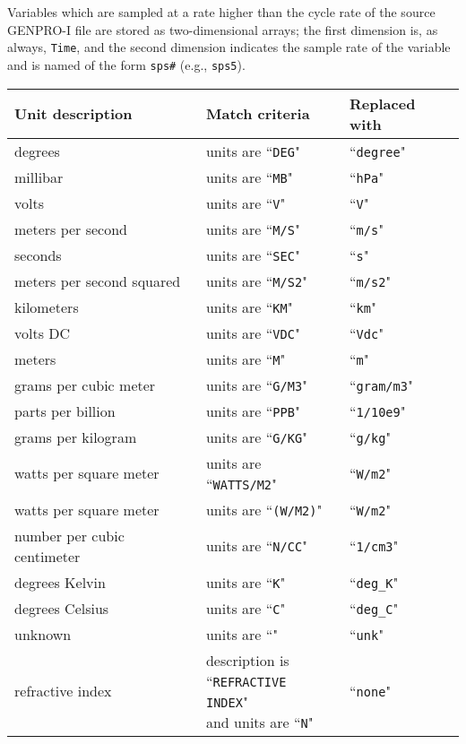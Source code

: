 \documentclass{report}
\begin{document}
Variables which are sampled at a rate higher than the cycle rate of the source GENPRO-I file are stored as two-dimensional arrays; the first dimension is, as always, \texttt{Time}, and the second dimension indicates the sample rate of the variable and is named of the form \texttt{sps\#} (e.g., \texttt{sps5}).

\begin{table}
\centering
\begin{tabular}{lll}
\toprule
Unit description & Match criteria & Replaced with \\
\midrule
degrees                     & units are ``\texttt{DEG}"      & ``\texttt{degree}" \\
millibar                    & units are ``\texttt{MB}"       & ``\texttt{hPa}" \\
volts                       & units are ``\texttt{V}"        & ``\texttt{V}" \\
meters per second           & units are ``\texttt{M/S}"      & ``\texttt{m/s}" \\
seconds                     & units are ``\texttt{SEC}"      & ``\texttt{s}" \\
meters per second squared   & units are ``\texttt{M/S2}"     & ``\texttt{m/s2}" \\
kilometers                  & units are ``\texttt{KM}"       & ``\texttt{km}" \\
volts DC                    & units are ``\texttt{VDC}"      & ``\texttt{Vdc}" \\
meters                      & units are ``\texttt{M}"        & ``\texttt{m}" \\
grams per cubic meter       & units are ``\texttt{G/M3}"     & ``\texttt{gram/m3}" \\
parts per billion           & units are ``\texttt{PPB}"      & ``\texttt{1/10e9}" \\
grams per kilogram          & units are ``\texttt{G/KG}"     & ``\texttt{g/kg}" \\
watts per square meter      & units are ``\texttt{WATTS/M2}" & ``\texttt{W/m2}" \\
watts per square meter      & units are ``\texttt{(W/M2)}"   & ``\texttt{W/m2}" \\
number per cubic centimeter & units are ``\texttt{N/CC}"     & ``\texttt{1/cm3}" \\
degrees Kelvin              & units are ``\texttt{K}"        & ``\texttt{deg\_K}" \\
degrees Celsius             & units are ``\texttt{C}"        & ``\texttt{deg\_C}" \\
unknown                     & units are ``\texttt{}"         & ``\texttt{unk}" \\
refractive index            & \shortstack[l]{description is\\``\texttt{REFRACTIVE INDEX}"\\and units are ``\texttt{N}"} & ``\texttt{none}" \\
\bottomrule
\end{tabular}
\end{table}
\end{document}
